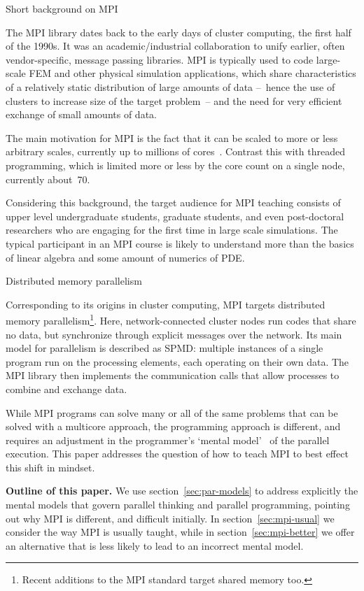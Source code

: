  {Short background on MPI}

The \ac{MPI} library dates back to the early days of cluster
computing, the first half of the 1990s. It was an academic/industrial
collaboration to unify earlier, often vendor-specific, message passing
libraries. MPI is typically used to code large-scale \ac{FEM} and
other physical simulation applications, which share characteristics of a
relatively static distribution of large amounts of data --~hence the
use of clusters to increase size of the target problem~-- and the need
for very efficient exchange of small amounts of data.

The main motivation for MPI is the fact that it can be scaled to more
or less arbitrary scales, currently up to millions of
cores~\cite{Balaji:PPL-mpi-on-1M}. Contrast this with threaded
programming, which is limited more or less by the core count on a
single node, currently about~70.

Considering this background, the target audience for \ac{MPI} teaching
consists of upper level undergraduate students, graduate students, and
even post-doctoral researchers who are engaging for the first time in
large scale simulations. The typical participant in an MPI course is
likely to understand more than the basics of linear algebra and some
amount of numerics of \acf{PDE}.

 {Distributed memory parallelism}

Corresponding to its origins in cluster computing,
MPI targets distributed memory parallelism\footnote{Recent additions
  to the MPI standard target shared memory too.}. Here, network-connected
cluster nodes run codes that share no data, but synchronize through
explicit messages over the network.
Its main model for parallelism is described as
\acf{SPMD}: multiple instances of a single program run on the
processing elements, each operating on their own data. The MPI library
then implements the communication calls that allow processes to
combine and exchange data.

While MPI programs can solve many or all of the same problems that can
be solved with a multicore approach, the programming approach is
different, and requires an adjustment in the programmer's `mental
model'~\cite{Dehnadi:meta-analysis,WasonJL:thinking} of the parallel
execution. This paper addresses the question of how to teach MPI to
best effect this shift in mindset.

\textbf{Outline of this paper.}
We use section~\ref{sec:par-models} to address explicitly the mental
models that govern parallel thinking and parallel programming,
pointing out why \ac{MPI} is different, and difficult initially.
In section~\ref{sec:mpi-usual}
we consider the way MPI is usually taught, while in section~\ref{sec:mpi-better}
we offer an alternative
that is less likely to lead to an incorrect mental model.

